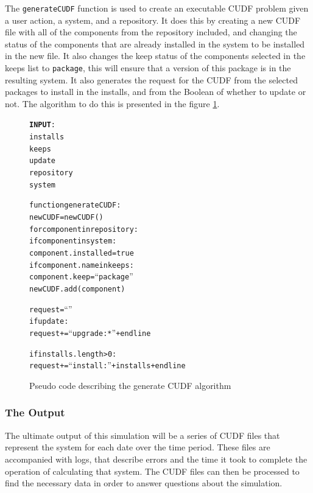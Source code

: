 The \verb+generateCUDF+ function is used to create an executable CUDF problem given a user action, a system, and a repository.
It does this by creating a new CUDF file with all of the components from the repository included, 
and changing the status of the components that are already installed in the system to be installed in the new file.
It also changes the keep status of the components selected in the keeps list to \verb+package+, this will ensure that a version of this package is in the resulting system.
It also generates the request for the CUDF from the selected packages to install in the installs, 
and from the Boolean of whether to update or not.
The algorithm to do this is presented in the figure \ref{generateCUDF}.

\begin{figure}[htp]
\begin{center}
\begin{alltt}
\textbf{INPUT}:
installs
keeps
update
repository
system


function generateCUDF:
    newCUDF = new CUDF()
    for component in repository:
        if component in system:
            component.installed = true
            if component.name in keeps:
                component.keep = ``package''
        newCUDF.add(component)
    
    request = ``''
    if update:
        request += ``upgrade: *'' + endline
        
    if installs.length > 0:
        request += ``install: ''  + installs + endline
    
\end{alltt}
\caption[Generate CUDF Pseudo Code]{Pseudo code describing the generate CUDF algorithm}
\label{generateCUDF}
\end{center}
\end{figure}


\subsubsection{The Output}
The ultimate output of this simulation will be a series of CUDF files that represent the system for each date over the time period.
These files are accompanied with logs, that describe errors and the time it took to complete the operation of calculating that system.
The CUDF files can then be processed to find the necessary data in order to answer questions about the simulation.

